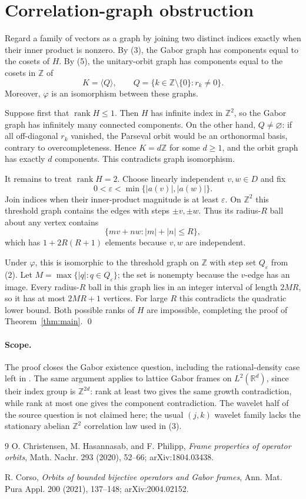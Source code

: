 \documentclass[11pt]{article}
\newcommand{\Z}{\mathbb Z}
\newcommand{\rank}{\operatorname{rank}}
\begin{document}
\section{Correlation-graph obstruction}

Regard a family of vectors as a graph by joining two distinct indices exactly
when their inner product is nonzero.  By (3), the Gabor graph has components
equal to the cosets of $H$.  By (5), the unitary-orbit graph has components
equal to the cosets in $\Z$ of
\[
 K=\langle Q\rangle,\qquad
 Q=\{k\in\Z\setminus\{0\}:r_k\ne0\}.                 \tag{6}
\]
Moreover, $\varphi$ is an isomorphism between these graphs.

Suppose first that $\rank H\le1$.  Then $H$ has infinite index in $\Z^2$, so
the Gabor graph has infinitely many connected components.  On the other hand,
$Q\ne\varnothing$: if all off-diagonal $r_k$ vanished, the Parseval orbit
would be an orthonormal basis, contrary to overcompleteness.  Hence
$K=d\Z$ for some $d\ge1$, and the orbit graph has exactly $d$ components.
This contradicts graph isomorphism.

It remains to treat $\rank H=2$.  Choose linearly independent $v,w\in D$ and
fix
\[
 0<\varepsilon<\min\{|a(v)|,|a(w)|\}.
\]
Join indices when their inner-product magnitude is at least $\varepsilon$.
On $\Z^2$ this threshold graph contains the edges with steps $\pm v,\pm w$.
Thus its radius-$R$ ball about any vertex contains
\[
 \{mv+nw:|m|+|n|\le R\},
\]
which has $1+2R(R+1)$ elements because $v,w$ are independent.

Under $\varphi$, this is isomorphic to the threshold graph on $\Z$ with step
set $Q_\varepsilon$ from (2).  Let
$M=\max\{|q|:q\in Q_\varepsilon\}$; the set is nonempty because the
$v$-edge has an image.  Every radius-$R$ ball in this graph lies in an integer
interval of length $2MR$, so it has at most $2MR+1$ vertices.  For large $R$
this contradicts the quadratic lower bound.  Both possible ranks of $H$ are
impossible, completing the proof of Theorem~\ref{thm:main}. \qed

\paragraph{Scope.}
The proof closes the Gabor existence question, including the rational-density
case left in \cite{C}.  The same argument applies to lattice Gabor frames on
$L^2(\mathbb R^d)$, since their index group is $\Z^{2d}$: rank at least two
gives the same growth contradiction, while rank at most one gives the
component contradiction.  The wavelet half of the source question is not
claimed here; the usual $(j,k)$ wavelet family lacks the stationary abelian
$\Z^2$ correlation law used in (3).

\begin{thebibliography}{9}
O. Christensen, M. Hasannasab, and F. Philipp,
\emph{Frame properties of operator orbits},
Math. Nachr. 293 (2020), 52--66; arXiv:1804.03438.

R. Corso,
\emph{Orbits of bounded bijective operators and Gabor frames},
Ann. Mat. Pura Appl. 200 (2021), 137--148; arXiv:2004.02152.
\end{thebibliography}
\end{document}
